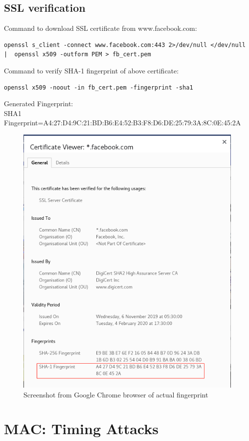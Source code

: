 \documentclass[12pt]{article}
\begin{document}
\begin{large}
\subsection{SSL verification}

Command to download SSL certificate from www.facebook.com:
\begin{lstlisting}
openssl s_client -connect www.facebook.com:443 2>/dev/null </dev/null |  openssl x509 -outform PEM > fb_cert.pem
\end{lstlisting}
\vspace{0.25cm}
Command to verify SHA-1 fingerprint of above certificate:
\begin{lstlisting}
openssl x509 -noout -in fb_cert.pem -fingerprint -sha1
\end{lstlisting}
\vspace{0.25cm}
Generated Fingerprint:\\
SHA1 Fingerprint=A4:27:D4:9C:21:BD:B6:E4:52:B3:F8:D6:DE:25:79:3A:8C:0E:45:2A\\

\begin{figure}[H]
\centering
\includegraphics[width = 0.70\linewidth]{./images/img2.png}
\caption{Screenshot from Google Chrome browser of actual fingerprint}
\end{figure}

\section{MAC: Timing Attacks}


\end{large}
\end{document}
